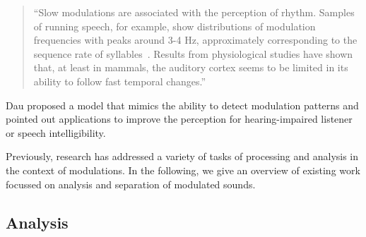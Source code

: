 \begin{quote}
``Slow modulations are associated with the perception of rhythm. Samples of running speech, for example, show distributions of modulation frequencies with peaks around 3-4 Hz, approximately corresponding to the sequence rate of syllables~\cite{plomp83}. Results from physiological studies have shown that, at least in mammals, the auditory cortex seems to be limited in its ability to follow fast temporal changes.''
\end{quote}

Dau proposed a model that mimics the ability to detect modulation patterns and pointed out applications to improve the perception for hearing-impaired listener or speech intelligibility.
\par
Previously, research has addressed a variety of tasks of processing and analysis in the context of modulations.
In the following, we give an overview of existing work focussed on analysis and separation of modulated sounds.

\subsection{Analysis}

